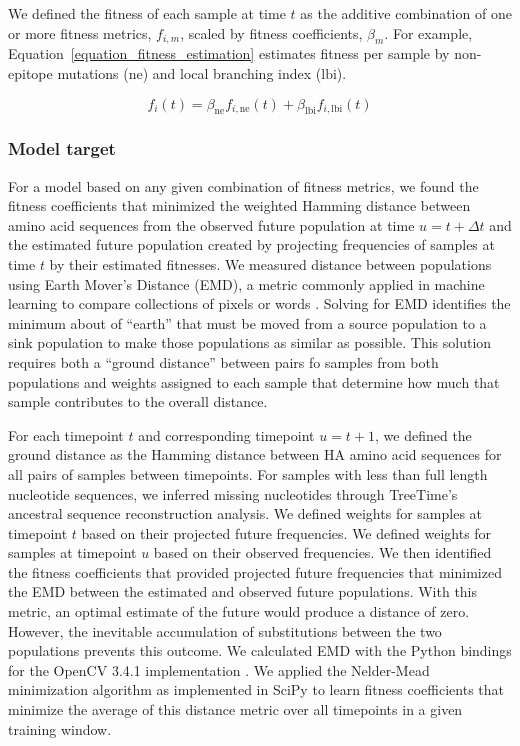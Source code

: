 We defined the fitness of each sample at time $t$ as the additive combination of one or more fitness metrics, $f_{i,m}$, scaled by fitness coefficients, $\beta_{m}$.
For example, Equation~\ref{equation_fitness_estimation} estimates fitness per sample by non-epitope mutations ($\mathrm{ne}$) and local branching index ($\mathrm{lbi}$).

\begin{equation}
    f_{i}(t) = \beta_{\mathrm{ne}}f_{i, \mathrm{ne}}(t) + \beta_{\mathrm{lbi}}f_{i, \mathrm{lbi}}(t)
    \label{equation_fitness_estimation}
\end{equation}

\subsubsection*{Model target}

For a model based on any given combination of fitness metrics, we found the fitness coefficients that minimized the weighted Hamming distance between amino acid sequences from the observed future population at time $u = t + \Delta{t}$ and the estimated future population created by projecting frequencies of samples at time $t$ by their estimated fitnesses.
We measured distance between populations using Earth Mover's Distance (EMD), a metric commonly applied in machine learning to compare collections of pixels or words \cite{Rubner1998,Kusner2015}.
Solving for EMD identifies the minimum about of ``earth'' that must be moved from a source population to a sink population to make those populations as similar as possible.
This solution requires both a ``ground distance'' between pairs fo samples from both populations and weights assigned to each sample that determine how much that sample contributes to the overall distance.

For each timepoint $t$ and corresponding timepoint $u = t + 1$, we defined the ground distance as the Hamming distance between HA amino acid sequences for all pairs of samples between timepoints.
For samples with less than full length nucleotide sequences, we inferred missing nucleotides through TreeTime's ancestral sequence reconstruction analysis.
We defined weights for samples at timepoint $t$ based on their projected future frequencies.
We defined weights for samples at timepoint $u$ based on their observed frequencies.
We then identified the fitness coefficients that provided projected future frequencies that minimized the EMD between the estimated and observed future populations.
With this metric, an optimal estimate of the future would produce a distance of zero.
However, the inevitable accumulation of substitutions between the two populations prevents this outcome.
We calculated EMD with the Python bindings for the OpenCV 3.4.1 implementation \cite{opencv_library}.
We applied the Nelder-Mead minimization algorithm as implemented in SciPy \cite{SciPy} to learn fitness coefficients that minimize the average of this distance metric over all timepoints in a given training window.

